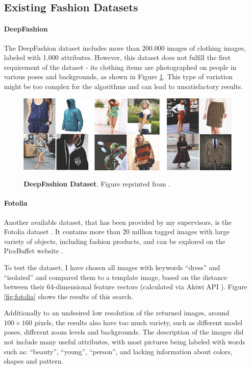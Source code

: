 \documentclass[12pt]{report}
\begin{document}
\subsection{Existing Fashion Datasets}
\paragraph{DeepFashion}
The DeepFashion dataset \cite{liu2016deepfashion} includes more than 200.000 images of clothing images, labeled with 1.000 attributes. However, this dataset does not fulfill the first requirement of the dataset - its clothing items are photographed on people in various poses and backgrounds, as shown in Figure \ref{fig:deepfashion}. This type of variation might be too complex for the algorithms and can lead to unsatisfactory results.

\begin{figure}[h]
\centering
{\includegraphics[width=\linewidth]{03_analysis/data/deepfashion}}
\caption{\label{fig:deepfashion} \textbf{DeepFashion Dataset}. Figure reprinted from \cite{liu2016deepfashion}.}
\end{figure}

\paragraph{Fotolia}
Another available dataset, that has been provided by my supervisors, is the Fotolia  dataset \cite{noauthor_fotolia_nodate}. It contains more than 20 million tagged images with large variety of objects, including fashion products, and can be explored on the PicsBuffet website \cite{mackowiak_picsbuffet_nodate}.

To test the dataset, I have chosen all images with keywords ``dress'' and ``isolated'' and compared them to a template image, based on the distance between their 64-dimensional feature vectors (calculated via Akiwi API \cite{sonnenberg_akiwi_nodate}). Figure \ref{fig:fotolia} shows the results of this search. 

Additionally to an undesired low resolution of the returned images, around $100 \times 160$ pixels, the results also have too much variety, such as different model poses, different zoom levels and backgrounds. The description of the images did not include many useful attributes, with most pictures being labeled with words such as: ``beauty'', ``young'', ``person'', and lacking information about colors, shapes and pattern.
\end{document}

